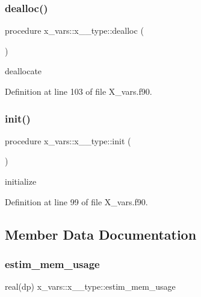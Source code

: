 \subsubsection{\texorpdfstring{dealloc()}{dealloc()}}
{\footnotesize\ttfamily procedure x\+\_\+vars\+::x\+\_\+\_\+type\+::dealloc (\begin{DoxyParamCaption}{ }\end{DoxyParamCaption})}



deallocate 



Definition at line 103 of file X\+\_\+vars.\+f90.

\mbox{\label{structx__vars_1_1x__2__type_ac3a132afc759fb6a00e53240fba9266e}} 
\subsubsection{\texorpdfstring{init()}{init()}}
{\footnotesize\ttfamily procedure x\+\_\+vars\+::x\+\_\+\_\+type\+::init (\begin{DoxyParamCaption}{ }\end{DoxyParamCaption})}



initialize 



Definition at line 99 of file X\+\_\+vars.\+f90.



\subsection{Member Data Documentation}
\mbox{\label{structx__vars_1_1x__2__type_ada4dee48cd358adb447688c11170d3b4}} 
\subsubsection{\texorpdfstring{estim\+\_\+mem\+\_\+usage}{estim\_mem\_usage}}
{\footnotesize\ttfamily real(dp) x\+\_\+vars\+::x\+\_\+\_\+type\+::estim\+\_\+mem\+\_\+usage}



